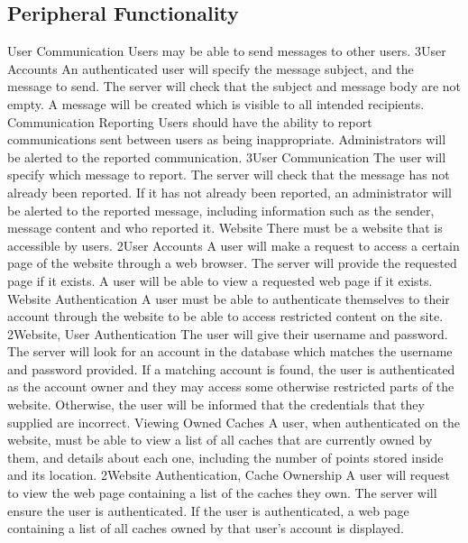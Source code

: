 	\subsection{Peripheral Functionality} %
		\funcreq %
			{User Communication}
			{Users may be able to send messages to other users.}
			{3}{User Accounts}
			{An authenticated user will specify the message subject, and the
			message to send.}
			{The server will check that the subject and message body are not
			empty.}
			{A message will be created which is visible to all intended
			recipients.}
		\funcreq %
			{Communication Reporting}
			{Users should have the ability to report communications sent
			between users as being inappropriate. Administrators will be
			alerted to the reported communication.}
			{3}{User Communication}
			{The user will specify which message to report.}
			{The server will check that the message has not already been 
			reported.}
			{If it has not already been reported, an administrator will 
			be alerted to the reported message, including information 
			such as the sender, message content and who reported it.}
		\funcreq %
			{Website}
			{There must be a website that is accessible by users.}
			{2}{User Accounts}
			{A user will make a request to access a certain page of the website
			through a web browser.}
			{The server will provide the requested page if it exists.}
			{A user will be able to view a requested web page if it exists.}
		\funcreq %
			{Website Authentication}
			{A user must be able to authenticate themselves to their account
			through the website to be able to access restricted content on the
			site.}
			{2}{Website, User Authentication}
			{The user will give their username and password.}
			{The server will look for an account in the database which matches
			the username and password provided.}
			{If a matching account is found, the user is authenticated as 
			the account owner and they may access some otherwise restricted 
			parts of the website. Otherwise, the user will be informed that the
			credentials that they supplied are incorrect.}
		\funcreq %
			{Viewing Owned Caches}
			{A user, when authenticated on the website, must be able to view a
			list of all caches that are currently owned by them, and details
			about each one, including the number of points stored inside and
			its location.}
			{2}{Website Authentication, Cache Ownership}
			{A user will request to view the web page containing a list of the
			caches they own.}
			{The server will ensure the user is authenticated.}
			{If the user is authenticated, a web page containing a list of all
			caches owned by that user's account is displayed.}
